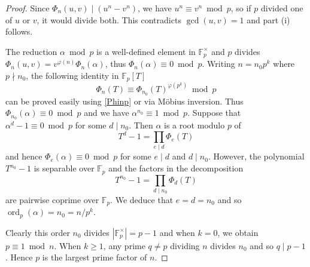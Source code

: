 \documentclass[10pt,a4paper]{amsart}
\DeclareMathOperator{\ord}{ord}
\begin{document}
\begin{proof}
Since $\Phi_n(u,v)\mid \left(u^n-v^n\right)$, we have $u^n\equiv v^n\bmod p$, so if $p$ divided one of $u$ or $v$, it would divide both. This contradicts $\gcd(u,v)=1$ and part (i) follows.
\medskip

The reduction $\alpha\bmod p$ is a well-defined element in $\mathbb F_p^\times$ and $p$ divides $\Phi_n(u,v)=v^{\varphi(n)}\Phi_{n}(\alpha)$,  thus $\Phi_{n}(\alpha)\equiv 0\bmod p$. 
Writing $n=n_0p^k$ where $p\nmid n_0$, the following identity in $\mathbb{F}_p[T]$
\[\Phi_n(T)\equiv\Phi_{n_0}(T)^{\varphi(p^k)}\bmod p\]
can be proved easily using \eqref{Phinp} or via M\"{o}bius inversion. Thus $\Phi_{n_0}(\alpha)\equiv 0\bmod p$ and we have $\alpha^{n_0}\equiv 1\bmod p$. 
Suppose that $\alpha^d-1\equiv 0\bmod p$ for some $d\mid n_0$. Then $\alpha$ is a root modulo $p$ of 
\[T^{d}-1=\prod_{e\mid d}\Phi_e(T)\]
and hence $\Phi_e(\alpha)\equiv 0\bmod p$ for some $e\mid d$ and $d\mid n_0$. 
However, the polynomial $T^{n_0}-1$ is separable over $\mathbb{F}_p$ and the factors in the decomposition
\[T^{n_0}-1=\prod_{d\mid n_0}\Phi_d(T)\]
are pairwise coprime over $\mathbb{F}_p$. We deduce that $e=d=n_0$ and so $\ord_p(\alpha)=n_0=n/p^k$. 
\medskip

Clearly this order $n_0$ divides $\left|\mathbb{F}_p^\times\right|=p-1$ and when $k=0$, we obtain $p\equiv 1\bmod n$. 
When $k\geq 1$, any prime $q\neq p$ dividing $n$ divides $n_0$ and so $q\mid p-1$. Hence $p$ is the largest prime factor of $n$.
\end{proof}
\end{document}
